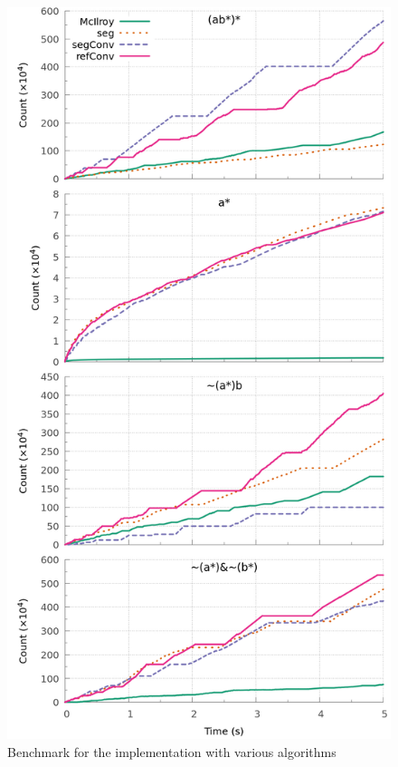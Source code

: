 \begin{figure}[!t]
  \centering
  \includegraphics[width=0.95\linewidth]{measure/haskell_all.png}
  \caption{Benchmark for the \haskell implementation with various algorithms}
  \label{bench:haskell:all}
\end{figure}

